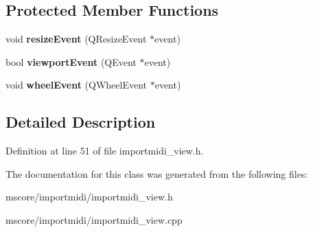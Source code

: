 \subsection*{Protected Member Functions}
\begin{DoxyCompactItemize}
\item 
\mbox{\label{class_tracks_view_af2553e9d76693d1dad1413392f49cb64}} 
void {\bfseries resize\+Event} (Q\+Resize\+Event $\ast$event)
\item 
\mbox{\label{class_tracks_view_ae1a314539a350dcd82ade91dc7769468}} 
bool {\bfseries viewport\+Event} (Q\+Event $\ast$event)
\item 
\mbox{\label{class_tracks_view_a29341032915e4cf12845e0cfe7eae526}} 
void {\bfseries wheel\+Event} (Q\+Wheel\+Event $\ast$event)
\end{DoxyCompactItemize}


\subsection{Detailed Description}


Definition at line 51 of file importmidi\+\_\+view.\+h.



The documentation for this class was generated from the following files\+:\begin{DoxyCompactItemize}
\item 
mscore/importmidi/importmidi\+\_\+view.\+h\item 
mscore/importmidi/importmidi\+\_\+view.\+cpp\end{DoxyCompactItemize}
